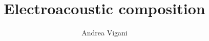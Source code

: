 \documentclass[a4paper,11pt]{book}
\begin{document}
\author{Andrea Vigani}
\title{Electroacoustic composition}
\maketitle


\tableofcontents



\end{document}
